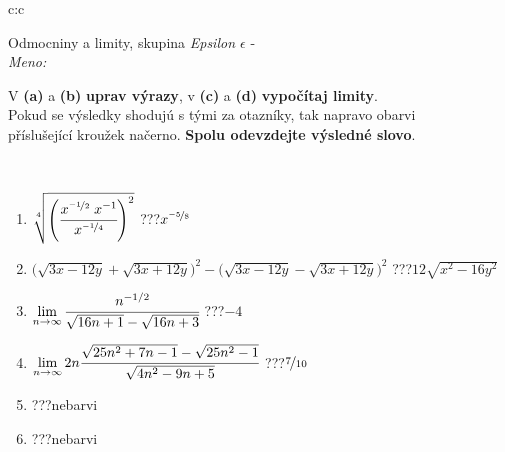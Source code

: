 \documentclass[10pt]{report}
\begin{document}
\newpage
\thispagestyle{empty}
\begin{tabular}{c:c}
\begin{minipage}[c][104.5mm][t]{0.5\linewidth}
\begin{center}
\vspace{7mm}
{\huge Odmocniny a limity, skupina \textit{Epsilon $\epsilon$} -}\\[5mm]
\textit{Meno:}\phantom{xxxxxxxxxxxxxxxxxxxxxxxxxxxxxxxxxxxxxxxxxxxxxxxxxxxxxxxxxxxxxxxxx}\\[5mm]
\begin{minipage}{0.95\linewidth}
\begin{center}
V \textbf{(a)} a \textbf{(b)} \textbf{uprav výrazy}, v \textbf{(c)} a \textbf{(d)} \textbf{vypočítaj limity}.\\Pokud se výsledky shodujú s tými za otazníky, tak napravo obarvi\\příslušející kroužek načerno. \textbf{Spolu odevzdejte výsledné slovo}.
\end{center}
\end{minipage}
\\[1mm]
\begin{minipage}{0.79\linewidth}
\begin{center}
\begin{varwidth}{\linewidth}
\begin{enumerate}
\small
\item $\sqrt[4]{\left(\cfrac{x^{\nicefrac{-1}{2}}\;x^{-1}}{x^{\nicefrac{-1}{4}}}\right)^{2}}$\quad \dotfill\; ???\;\dotfill \quad $x^{\nicefrac{-5}{8}}$
\item {\footnotesize{\scriptsize$\big(\sqrt{3x-12y}+\sqrt{3x+12y}\big)^2-\big(\sqrt{3x-12y}-\sqrt{3x+12y}\big)^2$}\quad \dotfill\; ???\;\dotfill \quad $12\sqrt{x^2-16y^2}$}
\item $\lim\limits_{n\to\infty}\cfrac{n^{-1/2}}{\sqrt{16n+1}-\sqrt{16n+3}}$\quad \dotfill\; ???\;\dotfill \quad $-4$
\item $\lim\limits_{n\to\infty}2n\cfrac{\sqrt{25n^2+7n-1}-\sqrt{25n^2-1}}{\sqrt{4n^2-9n+5}}$\quad \dotfill\; ???\;\dotfill \quad $\nicefrac{7}{10}$
\item \quad \dotfill\; ???\;\dotfill \quad nebarvi
\item \quad \dotfill\; ???\;\dotfill \quad nebarvi
\end{enumerate}
\end{varwidth}
\end{center}
\end{minipage}
\begin{minipage}{0.20\linewidth}

\end{minipage}
\end{center}
\end{minipage}
\end{tabular}
\end{document}
